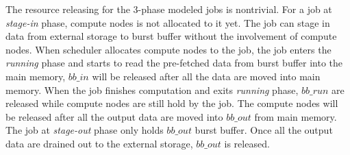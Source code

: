 

The resource releasing for the 3-phase modeled jobs is nontrivial. 
For a job at \textit{stage-in} phase, compute nodes is not allocated to it yet. 
The job can stage in data from external storage to burst buffer without the involvement of compute nodes.
When scheduler allocates compute nodes to the job, the job enters the \textit{running} phase 
and starts to read the pre-fetched data from burst buffer into the main memory, 
$bb\_in$ will be released after all the data are moved into main memory. 
When the job finishes computation and exits \textit{running} phase, 
$bb\_run$ are released while compute nodes are still hold by the job. 
The compute nodes will be released after all the output data are moved into $bb\_out$ from main memory.
The job at \textit{stage-out} phase only holds $bb\_out$ burst buffer. 
Once all the output data are drained out to the external storage,  
$bb\_out$ is released.


